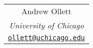 \begin{tabular}{c}
Andrew Ollett\\[2ex]
{\small\emph{University of Chicago}}\\[1ex]
{\small\href{mailto:ollett@uchicago.edu}{\texttt{ollett@uchicago.edu}}}
\end{tabular}